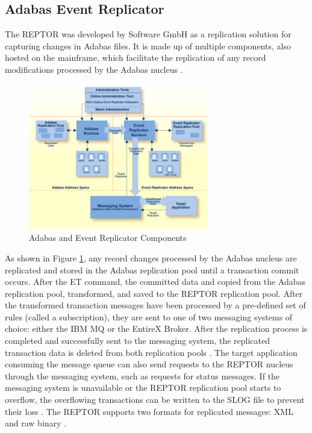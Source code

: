 \subsection{Adabas Event Replicator}
\label{ch02:fundamentals:adabas:reptor}
The \ac{REPTOR} was developed by Software GmbH as a replication solution for capturing changes in Adabas files. It is made up of multiple components, also hosted on the mainframe, which facilitate the replication of any record modifications processed by the Adabas nucleus \cite{storr2011reptor}.

\begin{figure}[htbp]
 \centering
 \includegraphics[width=0.7\textwidth]{chapters/images/reptor_architecture.png}
 \caption{Adabas and Event Replicator Components \cite{reptorconcepts}}
 \label{fig:fundamentals:reptorarchitecture}
\end{figure}

As shown in Figure \ref{fig:fundamentals:reptorarchitecture}, any record changes processed by the Adabas nucleus are replicated and stored in the Adabas replication pool until a transaction commit occurs. After the \ac{ET} command, the committed data and copied from the Adabas replication pool, transformed, and saved to the \ac{REPTOR} replication pool. After the transformed transaction messages have been processed by a pre-defined set of rules (called a subscription), they are sent to one of two messaging systems of choice: either the IBM MQ or the EntireX Broker. After the replication process is completed and successfully sent to the messaging system, the replicated transaction data is deleted from both replication pools \cite{reptorconcepts}. The target application consuming the message queue can also send requests to the \ac{REPTOR} nucleus through the messaging system, such as requests for status messages. If the messaging system is unavailable or the \ac{REPTOR} replication pool starts to overflow, the overflowing transactions can be written to the \ac{SLOG} file to prevent their loss \cite{storr2011reptor}. The \ac{REPTOR} supports two formats for replicated messages: XML and raw binary \cite{artconcepts}.

